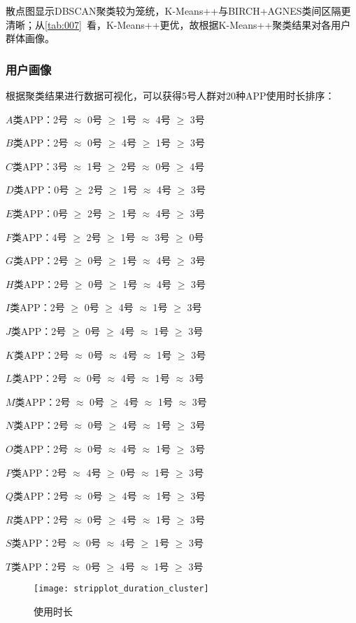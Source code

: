 \documentclass[withoutpreface,bwprint]{cumcmthesis}
\begin{document}
散点图显示DBSCAN聚类较为笼统，K-Means++与BIRCH+AGNES类间区隔更清晰；从\cref{tab:007}~看，K-Means++更优，故根据K-Means++聚类结果对各用户群体画像。

\subsubsection{用户画像}

根据聚类结果进行数据可视化，可以获得5号人群对20种APP使用时长排序：

$A$类APP：2号 $\approx$ 0号 $\ge$ 1号 $\approx$ 4号 $\ge$ 3号

$B$类APP：2号 $\approx$ 0号 $\ge$ 4号 $\ge$ 1号 $\ge$ 3号

$C$类APP：3号 $\approx$ 1号 $\ge$ 2号 $\approx$ 0号 $\ge$ 4号

$D$类APP：0号 $\ge$ 2号 $\ge$ 1号 $\approx$ 4号 $\ge$ 3号

$E$类APP：0号 $\ge$ 2号 $\ge$ 1号 $\approx$ 4号 $\ge$ 3号

$F$类APP：4号 $\ge$ 2号 $\ge$ 1号 $\approx$ 3号 $\ge$ 0号

$G$类APP：2号 $\ge$ 0号 $\ge$ 1号 $\approx$ 4号 $\ge$ 3号

$H$类APP：2号 $\ge$ 0号 $\ge$ 1号 $\approx$ 4号 $\ge$ 3号

$I$类APP：2号 $\ge$ 0号 $\ge$ 4号 $\approx$ 1号 $\ge$ 3号

$J$类APP：2号 $\ge$ 0号 $\ge$ 4号 $\approx$ 1号 $\ge$ 3号

$K$类APP：2号 $\approx$ 0号 $\approx$ 4号 $\approx$ 1号 $\ge$ 3号

$L$类APP：2号 $\approx$ 0号 $\approx$ 4号 $\approx$ 1号 $\approx$ 3号

$M$类APP：2号 $\approx$ 0号 $\ge$ 4号 $\approx$ 1号 $\approx$ 3号

$N$类APP：2号 $\approx$ 0号 $\ge$ 4号 $\approx$ 1号 $\ge$ 3号

$O$类APP：2号 $\approx$ 0号 $\approx$ 4号 $\approx$ 1号 $\ge$ 3号

$P$类APP：2号 $\approx$ 4号 $\ge$ 0号 $\approx$ 1号 $\ge$ 3号

$Q$类APP：2号 $\approx$ 0号 $\ge$ 4号 $\approx$ 1号 $\ge$ 3号

$R$类APP：2号 $\approx$ 0号 $\ge$ 4号 $\approx$ 1号 $\ge$ 3号

$S$类APP：2号 $\approx$ 0号 $\approx$ 4号 $\ge$ 1号 $\ge$ 3号

$T$类APP：2号 $\approx$ 0号 $\ge$ 4号 $\approx$ 1号 $\ge$ 3号
\begin{figure}[!htbp]
    \centering
    \texttt{[image: stripplot\_duration\_cluster]}
    \caption{使用时长}
    \label{fig:015}
\end{figure}
\end{document}

